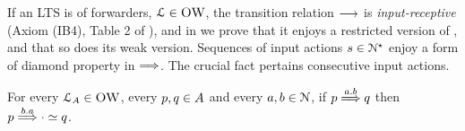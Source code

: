 If an LTS is of forwarders, \ie $\mathcal{L} \in \textsc{OW}$, the transition relation $\mathrel{\overset{}\longrightarrow}$ is {\em input-receptive}
(Axiom (IB4), Table 2 of \cite{DBLP:conf/concur/Selinger97}),
and in  we prove that it enjoys a restricted version
of \restrictedinputcommutativity, and that so does its weak version.
Sequences of input actions $s \in \mathcal{N}^\star$ enjoy a form of
diamond property in $\mathrel{\overset{} \Longrightarrow}$. The crucial fact pertains consecutive input actions.




\begin{lemma}%
  \label{lem:weak-a-swap}
  For every $\mathcal{L}_A \in \textsc{OW}$, every $p, q \in A$ and every $a, b \in \mathcal{N}$,
  if $p \mathrel{\overset{a.b} \Longrightarrow} q$ then $p \mathrel{\overset{b.a} \Longrightarrow} \cdot \simeq q$.
\end{lemma}

